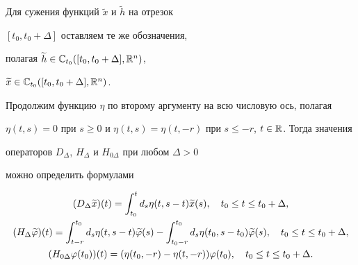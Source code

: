 Для сужения функций $\widetilde{x}$ и $\widetilde{h} $ на отрезок


$[t_{0},t_{0}+\Delta] $ оставляем те же обозначения,


полагая $\widetilde{h}\in\Bbb{C}_{t_{0}} ([


t_{0},t_{0}+\Delta],\Bbb{R}^{n}) $,


$\widetilde{x}\in\Bbb{C}_{t_{0}} ([


t_{0},t_{0}+\Delta],\Bbb{R}^{n})$.





Продолжим функцию $\eta$ по второму аргументу на всю числовую ось, полагая


$\eta (t,s)=0$ при $s\geq0$ и $\eta (t,s)


=\eta (t,-r) $ при $s\leq-r$, $t\in\Bbb{R}$. Тогда значения 


операторов $D_{\Delta}$, $H_{\Delta}$ и $H_{0\Delta}$ при любом $\Delta>0$ 


можно определить формулами


\begin{gather}


(D_{\Delta}\widetilde{x}) (t)=\int_{t_{0}}


^{t}d_{s}\eta (t,s-t) \widetilde{x} (s)


,\quad t_{0}\leq t\leq t_{0}+\Delta, \label{oper_delta1} \\


%


(H_{\Delta}\widetilde{\varphi}) (t)


=\int _{t-r}^{t_{0}}d_{s}\eta (t,s-t)


\widetilde{\varphi} (s)


-\int_{t_{0}-r}^{t_{0}}d_{s}\eta (t_{0},s-t_{0})


\widetilde{\varphi} (s),\quad t_{0}\leq t\leq


t_{0}+\Delta, \notag \\


%


(H_{0\Delta}\varphi (t_{0})) (


t)=(\eta (t_{0},-r) -\eta (


t,-r)) \varphi (t_{0}),\quad t_{0}\leq


t\leq t_{0}+\Delta.\notag


\end{gather}





